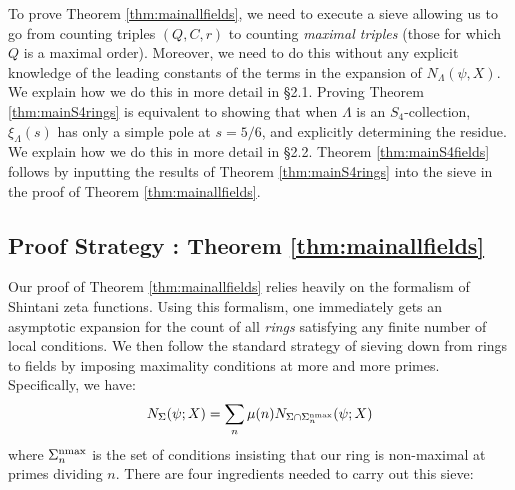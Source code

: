 \documentclass{article}
\begin{document}
To prove Theorem \ref{thm:mainallfields}, we need to execute a sieve allowing us to go from counting triples $(Q,C,r)$ to counting {\it maximal triples} (those for which $Q$ is a maximal order). Moreover, we need to do this without any explicit knowledge of the leading constants of the terms in the expansion of $N_\Lambda(\psi,X)$. We explain how we do this in more detail in \S2.1. Proving Theorem \ref{thm:mainS4rings} is equivalent to showing that when $\Lambda$ is an $S_4$-collection, $\xi_\Lambda(s)$ has only a simple pole at $s=5/6$, and explicitly determining the residue. We explain how we do this in more detail in \S2.2. Theorem \ref{thm:mainS4fields} follows by inputting the results of Theorem \ref{thm:mainS4rings} into the sieve in the proof of Theorem \ref{thm:mainallfields}.





\subsection{Proof Strategy : Theorem \ref{thm:mainallfields}}

Our proof of Theorem \ref{thm:mainallfields} relies heavily on the formalism of Shintani zeta functions\cite{SatoShintani}. Using this formalism, one immediately gets an asymptotic expansion for the count of all \textit{rings} satisfying any finite number of local conditions. We then follow the standard strategy of sieving down from rings to fields by imposing maximality conditions at more and more primes. Specifically, we have:
$$N_{\Sigma}(\psi;X)=\sum_n \mu(n)N_{\Sigma\cap \Sigma^{\rm nmax}_n}(\psi;X)$$
where $\Sigma^{\rm nmax}_n$ is the set of conditions insisting that our ring is non-maximal at primes dividing $n$.
There are four ingredients needed to carry out this sieve:
\end{document}
